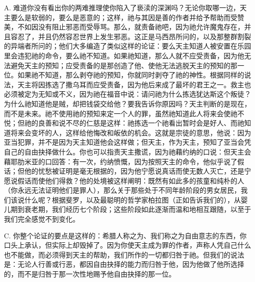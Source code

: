 A. 难道你没有看出你的两难推理使你陷入了亵渎的深渊吗？无论你取哪一边，天主要么是软弱的，要么是恶意的；这样，祂与其因是善的作者并给予帮助而受赞美，不如因没有阻止邪恶而受辱骂。那么，就责备祂吧，因为祂允许魔鬼存在，并且容忍了，并且仍然容忍世界上发生邪恶。这正是马西昂所问的，以及那整群割裂的异端者所问的；他们大多编造了类似这样的论证：要么天主知道人被安置在乐园里会违犯祂的命令，要么祂不知道。如果祂知道，那么人就不应受责备，因为他无法避免天主的预知；应受责备的是那创造了他、使他无法逃脱天主的预知的那一位。如果祂不知道，那么剥夺祂的预知，你就同时剥夺了祂的神性。根据同样的说法，天主将因拣选了撒乌耳而应受责备，因为他后来成了最坏的君王之一。救主也必须被定为无知或不义，因为祂在福音中说：请问祂为什么拣选犹达斯这个叛徒？为什么祂知道他是贼，却把钱袋交给他？要我告诉你原因吗？天主判断的是现在，而不是未来。祂不使用祂的预知来定一个人的罪，虽然祂知道此人将来会使祂不悦；但祂的良善和说不尽的仁慈是这样：祂拣选一个祂看出暂时会是好人、而祂知道将来会变坏的人，这样给他悔改和皈依的机会。这就是宗徒的意思，他说：因为亚当犯罪，并不是因为天主知道他会这样做；但天主，作为天主，预知了亚当会凭自己的自由抉择做什么。你也可以指责天主撒谎，因为祂藉约纳的口说：但天主会藉耶肋米亚的口回答：有一次，约纳愤慨，因为按照天主的命令，他似乎说了假话；但他的忧愁被证明是毫无根据的，因为他宁愿说真话而使无数人灭亡，还是宁愿说假话而使他们得救？他的处境被这样阐明：既然有如此多的孩童和纯朴的人（你永远无法证明他们是罪人），那么关于那些处于不同年龄阶段的男女居民，我们该说什么呢？根据斐罗，以及最聪明的哲学家柏拉图（正如告诉我们的），从婴儿期到衰老期，我们经历七个阶段；这些阶段如此逐渐而温和地相互跟随，以至于我们完全感觉不到变化。\par

C. 你整个论证的要点是这样的：希腊人称之为、我们称之为自由意志的东西，你口头上承认，但实际上却毁掉了。因为你使天主成为罪的作者，声称人凭自己什么也不能做，而必须得到天主的帮助，我们所作的一切都归咎于祂。但我们的说法是：无论人行善或行恶，都因自由抉择的能力而归咎于他，因为他做了他所选择的，而不是归咎于那一次性地赐予他自由抉择的那一位。\par

